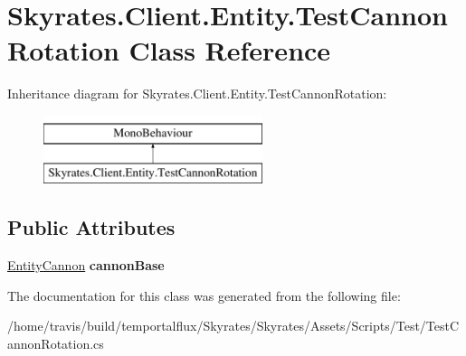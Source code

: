 \hypertarget{class_skyrates_1_1_client_1_1_entity_1_1_test_cannon_rotation}{\section{Skyrates.\-Client.\-Entity.\-Test\-Cannon\-Rotation Class Reference}
\label{class_skyrates_1_1_client_1_1_entity_1_1_test_cannon_rotation}
}
Inheritance diagram for Skyrates.\-Client.\-Entity.\-Test\-Cannon\-Rotation\-:\begin{figure}[H]
\begin{center}
\leavevmode
\includegraphics[height=2.000000cm]{class_skyrates_1_1_client_1_1_entity_1_1_test_cannon_rotation}
\end{center}
\end{figure}
\subsection*{Public Attributes}
\begin{DoxyCompactItemize}
\item 
\hypertarget{class_skyrates_1_1_client_1_1_entity_1_1_test_cannon_rotation_a50477f98f5e5000043a6791961b98e46}{\hyperlink{class_skyrates_1_1_entity_1_1_entity_cannon}{Entity\-Cannon} {\bfseries cannon\-Base}}\label{class_skyrates_1_1_client_1_1_entity_1_1_test_cannon_rotation_a50477f98f5e5000043a6791961b98e46}

\end{DoxyCompactItemize}


The documentation for this class was generated from the following file\-:\begin{DoxyCompactItemize}
\item 
/home/travis/build/temportalflux/\-Skyrates/\-Skyrates/\-Assets/\-Scripts/\-Test/Test\-Cannon\-Rotation.\-cs\end{DoxyCompactItemize}
